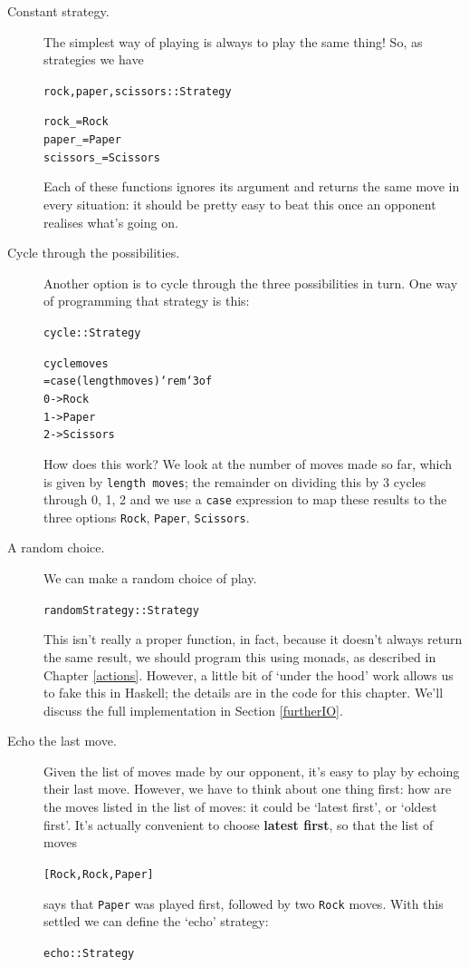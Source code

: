 \begin{description}

\item[Constant strategy.]
The simplest way of playing is always to play the same thing! So, as strategies we have
\begin{alltt}
rock, paper, scissors :: Strategy 

rock _     = Rock
paper _    = Paper
scissors _ = Scissors
\end{alltt}
Each of these functions ignores its argument and returns the same move in every situation: it should be pretty easy to beat this once an opponent realises what's going on.

\item[Cycle through the possibilities.]
Another option is to cycle through the three possibilities in turn. One way of programming that strategy is this:
\begin{alltt}
cycle :: Strategy

cycle moves
  = case (length moves) `rem` 3 of 
      0 -> Rock
      1 -> Paper
      2 -> Scissors
\end{alltt}
How does this work? We look at the number of moves made so far, which is given by \texttt{length moves}; the remainder on dividing this by 3 cycles through 0, 1, 2 and we use a \texttt{case} expression to map these results to the three options \texttt{Rock}, \texttt{Paper}, \texttt{Scissors}.

\item[A random choice.]
We can make a random choice of play. 
\begin{alltt}
randomStrategy :: Strategy
\end{alltt}
This isn't really a proper function, in fact, because it doesn't always return the same result, we should program this using monads, as described in Chapter \ref{actions}. However, a little bit of `under the hood' work allows us to fake this in Haskell; the details are in the code for this chapter. We'll discuss the full implementation in Section \ref{furtherIO}.

\item[Echo the last move.]\label{echoStrat}
Given the list of moves made by our opponent, it's easy to play by echoing their last move. However, we have to think about one thing first: how are the moves listed in the list of moves: it could be `latest first', or `oldest first'. It's actually convenient to choose \textbf{latest first}, so that the list of moves
\begin{alltt}
[Rock,Rock,Paper]
\end{alltt}
says that \texttt{Paper} was played first, followed by two \texttt{Rock} moves. With this settled we can define the `echo' strategy:
\begin{alltt}
echo :: Strategy


\end{alltt}
\end{description}
